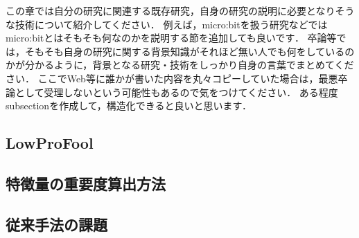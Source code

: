 この章では自分の研究に関連する既存研究，自身の研究の説明に必要となりそうな技術について紹介してください．
例えば，micro:bitを扱う研究などではmicro:bitとはそもそも何なのかを説明する節を追加しても良いです．
卒論等では，そもそも自身の研究に関する背景知識がそれほど無い人でも何をしているのかが分かるように，背景となる研究・技術をしっかり自身の言葉でまとめてください．
ここでWeb等に誰かが書いた内容を丸々コピーしていた場合は，最悪卒論として受理しないという可能性もあるので気をつけてください．
ある程度subsectionを作成して，構造化できると良いと思います．

\subsection{LowProFool}

\subsection{特徴量の重要度算出方法}

\subsection{従来手法の課題}